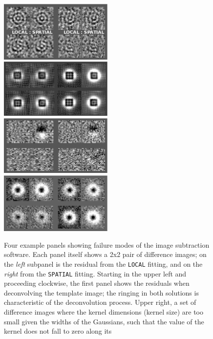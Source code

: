 \documentclass[floatfix, apj]{emulateapj}
\begin{document}
\begin{figure}[!ht]
  \includegraphics[width=0.5\textwidth, height=0.25\textwidth]{fig1a.eps}
  \includegraphics[width=0.5\textwidth, height=0.25\textwidth]{fig1b.eps} \\
  \includegraphics[width=0.5\textwidth, height=0.25\textwidth]{fig1c.eps}
  \includegraphics[width=0.5\textwidth, height=0.25\textwidth]{fig1d.eps} \\
\caption{Four example panels showing failure modes of the image
  subtraction software.
  Each panel itself shows a 2x2 pair of difference images; on the {\it
    left} subpanel is the residual from the {\tt LOCAL} fitting, and
  on the {\it right} from the {\tt SPATIAL} fitting.
  Starting in the upper left and proceeding clockwise, the first panel
  shows the residuals when deconvolving the template image; the
  ringing in both solutions is characteristic of the deconvolution
  process.
  Upper right, a set of difference images where the kernel dimensions
  (kernel size) are too small given the widths of the Gaussians, such
  that the value of the kernel does not fall to zero along its
}
\end{figure}
\end{document}
